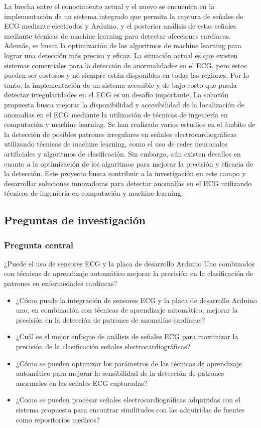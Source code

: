 La brecha entre el conocimiento actual y el nuevo se encuentra en la implementación de un sistema integrado que permita la captura de señales de ECG mediante electrodos y Arduino, y el posterior análisis de estas 
señales mediante técnicas de machine learning para detectar afecciones cardíacas. Además, se busca la optimización de los algoritmos de machine learning para lograr una detección más precisa y eficaz.
La situación actual es que existen sistemas comerciales para la detección de anormalidades en el ECG, pero estos pueden ser costosos y no siempre están disponibles en todas las regiones. 
Por lo tanto, la implementación de un sistema accesible y de bajo costo que pueda detectar irregularidades en el ECG es un desafío importante. La solución propuesta busca mejorar la disponibilidad y accesibilidad de la
localización de anomalías en el ECG mediante la utilización de técnicas de ingeniería en computación y machine learning.
Se han realizado varios estudios en el ámbito de la detección de posibles patrones irregulares en señales electrocardiográficas utilizando técnicas de machine learning, como el uso de redes neuronales artificiales y algoritmos de clasificación. 
Sin embargo, aún existen desafíos en cuanto a la optimización de los algoritmos para mejorar la precisión y eficacia de la detección. Este proyecto busca contribuir a la investigación en este campo y desarrollar 
soluciones innovadoras para detectar anomalías en el ECG utilizando técnicas de ingeniería en computación y machine learning.


\subsection{Preguntas de investigación}
\subsubsection{Pregunta central}
¿Puede el uso de sensores ECG y la placa de desarrollo Arduino Uno combinados con técnicas de aprendizaje automático mejorar la precisión en la clasificación de patrones en enfermedades cardíacas?\\

\begin{itemize}
	\item ¿Cómo puede la integración de sensores ECG y la placa de desarrollo Arduino uno, en 
		combinación con técnicas de aprendizaje automático, mejorar la precisión en la 
		detección de patrones de anomalías cardíacas?
	\item ¿Cuál es el mejor enfoque de análisis de señales ECG para maximizar la precisión de la 
		clasificación señales electrocardiográficas?
	\item ¿Cómo se pueden optimizar los parámetros de las técnicas de aprendizaje automático para 
		mejorar la sensibilidad de la detección de patrones anormales en las señales ECG capturadas?
	\item ¿Como se pueden procesar señales electrocardiográficas adquiridas con el sistema propuesto para encontrar similitudes con las adquiridas de fuentes como repositorios medicos?
\end{itemize}

